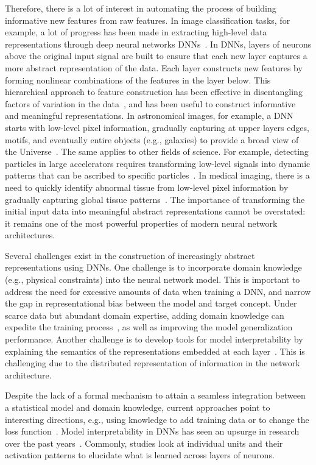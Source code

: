 Therefore, there is a lot of interest in automating the process of building informative new features from raw features.  In image classification tasks, for example, a lot of progress has been made in extracting high-level data representations through deep neural networks DNNs~\cite{Goodfellow_2016}. 
In DNNs, layers of neurons above the original input signal are built to ensure that each new layer captures a more abstract representation of the data. Each layer constructs new features by forming nonlinear combinations of the features in the layer below. 
This hierarchical approach to feature construction has been effective in disentangling factors of variation in the data~\cite{Hinton_2006,Bengio_2013,Goodfellow_2016}, and has been useful to construct informative and meaningful representations. 
In astronomical images, for example, a DNN starts with low-level pixel information, gradually capturing at upper layers edges, motifs, and eventually entire objects (e.g., galaxies) to provide a broad view of the Universe~\cite{Sanchez_2018,Huertas_Company_2018}. 
The same applies to other fields of science. For example, detecting particles in large accelerators requires transforming low-level signals into dynamic patterns that can be ascribed to specific particles~\cite{Belayneh_2020}. 
In medical imaging, there is a need to quickly identify abnormal tissue from low-level pixel information by gradually capturing global tissue patterns~\cite{Bychkov_2018}. 
The importance of transforming the initial input data into meaningful abstract representations cannot be overstated: it remains one of the most powerful properties of modern neural network architectures.  

Several challenges exist in the construction of increasingly abstract representations using DNNs. One challenge is to incorporate domain knowledge (e.g., physical constraints) into the neural network model. This is important to address the need for excessive amounts of data when training a DNN, and narrow the gap in representational bias between the model and target concept. Under scarce data but abundant domain expertise, adding domain knowledge can expedite the training process~\cite{Xie_2021}, as well as improving the model generalization performance. Another challenge is to develop tools for model interpretability by explaining the semantics of the representations embedded at each layer~\cite{Chakraborty_2017}. This is challenging due to the distributed representation of information in the network architecture. 

Despite the lack of a formal mechanism to attain a seamless integration between a statistical model and domain knowledge, current approaches point to interesting directions, e.g., using knowledge to add training data or to change the loss function~\cite{Vo_2017}. 
Model interpretability in DNNs has seen an upsurge in research over the past years~\cite{Chakraborty_2017}. 
Commonly, studies look at individual units and their activation patterns to elucidate what is learned across layers of neurons. 


